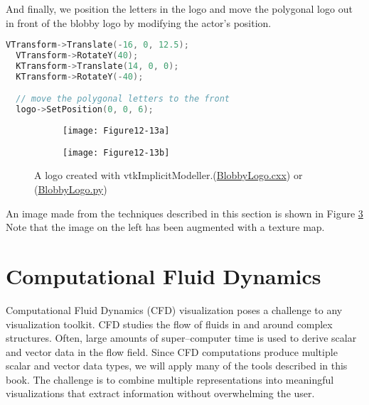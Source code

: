 \noindent And finally, we position the letters in the logo and move the
polygonal logo out in front of the blobby logo by modifying the
actor's position.

\begin{lstlisting}[language=C++, caption={Position the letters and move the polygonal logo.}]
  VTransform->Translate(-16, 0, 12.5);
  VTransform->RotateY(40);
  KTransform->Translate(14, 0, 0);
  KTransform->RotateY(-40);

  // move the polygonal letters to the front
  logo->SetPosition(0, 0, 6);
\end{lstlisting}

\begin{figure}[htb]
    \begin{subfigure}[h]{0.48\linewidth}
        \texttt{[image: Figure12-13a]}
        \caption*{}
        \label{fig:Figure12-13a}
    \end{subfigure}
    \hfill
    \begin{subfigure}[h]{0.48\linewidth}
        \texttt{[image: Figure12-13b]}
        \caption*{}
        \label{fig:Figure12-13b}
    \end{subfigure}
    \caption{A logo created with vtkImplicitModeller.(\href{https://lorensen.github.io/VTKExamples/site/Cxx/Visualization/BlobbyLogo/}{BlobbyLogo.cxx}) or (\href{https://lorensen.github.io/VTKExamples/site/Python/Visualization/BlobbyLogo/}{BlobbyLogo.py})}\label{fig:Figure12-13}
\end{figure}


\noindent An image made from the techniques described in this section is shown
in Figure \ref{fig:Figure12-13}  Note that the image on the left has been augmented with a texture map.

\section{Computational Fluid Dynamics}

Computational Fluid Dynamics (CFD) visualization poses a challenge to any visualization toolkit. CFD studies the flow of fluids in and around complex structures. Often, large amounts of super--computer time is used to derive scalar and vector data in the flow field. Since CFD computations produce multiple scalar and vector data types, we will apply many of the tools described in this book. The challenge is to combine multiple representations into meaningful visualizations that extract information without overwhelming the user.

